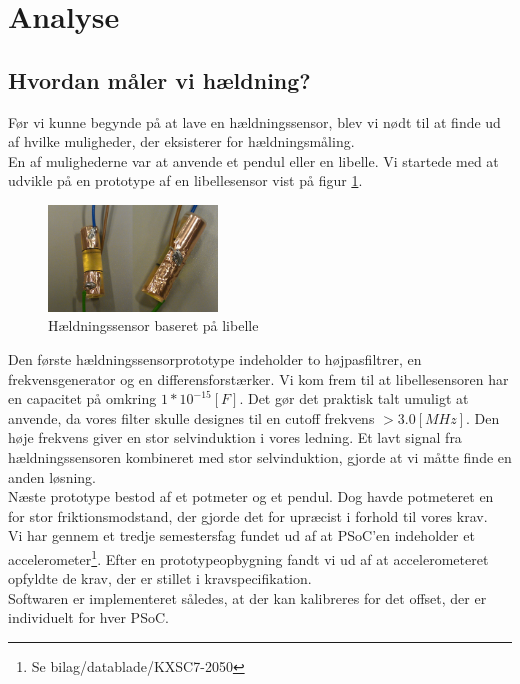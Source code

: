 \section{Analyse}
\label{ch:analyse}
\subsection{Hvordan måler vi hældning?}
Før vi kunne begynde på at lave en hældningssensor, blev vi nødt til at finde ud af hvilke muligheder, der eksisterer for hældningsmåling. \\
En af mulighederne var at anvende et pendul eller en libelle. Vi startede med at udvikle på en prototype af en libellesensor vist på figur \ref{fig:libelle}.
\begin{figure}[hbpt]
\centering
\includegraphics[width=0.4\textwidth]{billeder/libellesensor1}
\caption{Hældningssensor baseret på libelle}
\label{fig:libelle}
\end{figure}
Den første hældningssensorprototype indeholder to højpasfiltrer, en frekvensgenerator og en differensforstærker. Vi kom frem til at libellesensoren har en capacitet på omkring $1*10^{-15}[F]$. Det gør det praktisk talt umuligt at anvende, da vores filter skulle designes til en cutoff frekvens $>3.0[MHz]$. Den høje frekvens giver en stor selvinduktion i vores ledning. Et lavt signal fra hældningssensoren kombineret med stor selvinduktion, gjorde at vi måtte finde en anden løsning.\\
Næste prototype bestod af et potmeter og et pendul. Dog havde potmeteret en for stor friktionsmodstand, der gjorde det for upræcist i forhold til vores krav.\\
Vi har gennem et tredje semestersfag fundet ud af at PSoC'en indeholder et accelerometer\footnote{Se bilag/datablade/KXSC7-2050}. Efter en prototypeopbygning fandt vi ud af at accelerometeret opfyldte de krav, der er stillet i kravspecifikation. \\
Softwaren er implementeret således, at der kan kalibreres for det offset, der er individuelt for hver PSoC.
